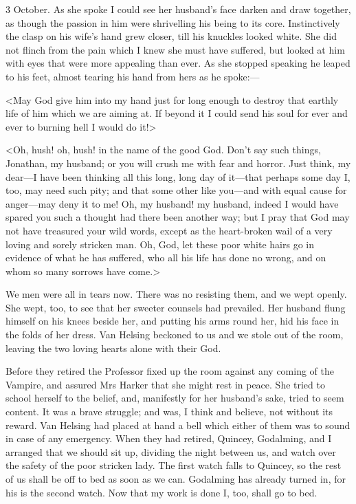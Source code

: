 \begin{diary}{3 October.}
As she spoke I could see her husband's face darken and draw together, as though the passion in him were shrivelling his being to its core. Instinctively the clasp on his wife's hand grew closer, till his knuckles looked white. She did not flinch from the pain which I knew she must have suffered, but looked at him with eyes that were more appealing than ever. As she stopped speaking he leaped to his feet, almost tearing his hand from hers as he spoke:—

<May God give him into my hand just for long enough to destroy that earthly life of him which we are aiming at. If beyond it I could send his soul for ever and ever to burning hell I would do it!>

<Oh, hush! oh, hush! in the name of the good God. Don't say such things, Jonathan, my husband; or you will crush me with fear and horror. Just think, my dear—I have been thinking all this long, long day of it—that \textellipsis perhaps \textellipsis some day \textellipsis I, too, may need such pity; and that some other like you—and with equal cause for anger—may deny it to me! Oh, my husband! my husband, indeed I would have spared you such a thought had there been another way; but I pray that God may not have treasured your wild words, except as the heart-broken wail of a very loving and sorely stricken man. Oh, God, let these poor white hairs go in evidence of what he has suffered, who all his life has done no wrong, and on whom so many sorrows have come.>

We men were all in tears now. There was no resisting them, and we wept openly. She wept, too, to see that her sweeter counsels had prevailed. Her husband flung himself on his knees beside her, and putting his arms round her, hid his face in the folds of her dress. Van Helsing beckoned to us and we stole out of the room, leaving the two loving hearts alone with their God.

Before they retired the Professor fixed up the room against any coming of the Vampire, and assured Mrs Harker that she might rest in peace. She tried to school herself to the belief, and, manifestly for her husband's sake, tried to seem content. It was a brave struggle; and was, I think and believe, not without its reward. Van Helsing had placed at hand a bell which either of them was to sound in case of any emergency. When they had retired, Quincey, Godalming, and I arranged that we should sit up, dividing the night between us, and watch over the safety of the poor stricken lady. The first watch falls to Quincey, so the rest of us shall be off to bed as soon as we can. Godalming has already turned in, for his is the second watch. Now that my work is done I, too, shall go to bed.
\end{diary}

